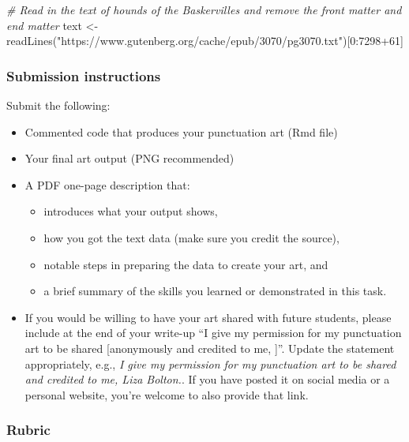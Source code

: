 \documentclass[
  openany]{book}
\newenvironment{Shaded}{\begin{snugshade}}{\end{snugshade}}
\newcommand{\CommentTok}[1]{\textcolor[rgb]{0.56,0.35,0.01}{\textit{#1}}}
\newcommand{\DecValTok}[1]{\textcolor[rgb]{0.00,0.00,0.81}{#1}}
\newcommand{\FunctionTok}[1]{\textcolor[rgb]{0.00,0.00,0.00}{#1}}
\newcommand{\NormalTok}[1]{#1}
\newcommand{\OtherTok}[1]{\textcolor[rgb]{0.56,0.35,0.01}{#1}}
\newcommand{\SpecialCharTok}[1]{\textcolor[rgb]{0.00,0.00,0.00}{#1}}
\newcommand{\StringTok}[1]{\textcolor[rgb]{0.31,0.60,0.02}{#1}}
\providecommand{\tightlist}{%
  \setlength{\itemsep}{0pt}\setlength{\parskip}{0pt}}
\begin{document}
\begin{Shaded}
\begin{Highlighting}[]
\CommentTok{\# Read in the text of hounds of the Baskervilles and remove the front matter and end matter}
\NormalTok{text }\OtherTok{\textless{}{-}} \FunctionTok{readLines}\NormalTok{(}\StringTok{"https://www.gutenberg.org/cache/epub/3070/pg3070.txt"}\NormalTok{)[}\DecValTok{0}\SpecialCharTok{:}\DecValTok{7298}\SpecialCharTok{+}\DecValTok{61}\NormalTok{]}
\end{Highlighting}
\end{Shaded}

\hypertarget{submission-instructions}{%
\subsubsection{Submission instructions}\label{submission-instructions}}

Submit the following:

\begin{itemize}
\tightlist
\item
  Commented code that produces your punctuation art (Rmd file)
\item
  Your final art output (PNG recommended)
\item
  A PDF one-page description that:

  \begin{itemize}
  \tightlist
  \item
    introduces what your output shows,
  \item
    how you got the text data (make sure you credit the source),
  \item
    notable steps in preparing the data to create your art, and
  \item
    a brief summary of the skills you learned or demonstrated in this task.
  \end{itemize}
\item
  If you would be willing to have your art shared with future students, please include at the end of your write-up ``I give my permission for my punctuation art to be shared {[}anonymously \textbar{} and credited to me, {]}''. Update the statement appropriately, e.g., \emph{I give my permission for my punctuation art to be shared and credited to me, Liza Bolton.}. If you have posted it on social media or a personal website, you're welcome to also provide that link.
\end{itemize}

\hypertarget{rubric-2}{%
\subsubsection{Rubric}\label{rubric-2}}
\end{document}
